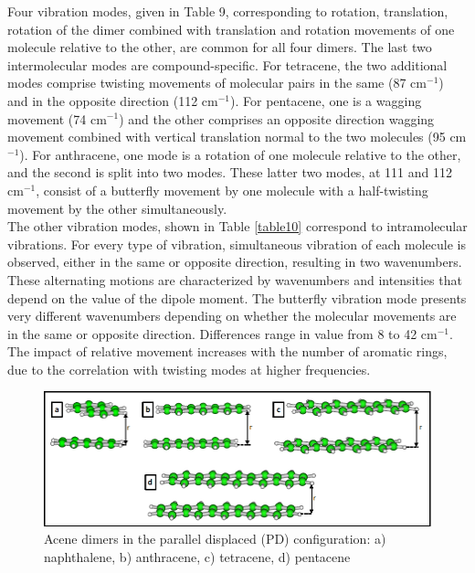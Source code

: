 Four vibration modes, given in Table 9, corresponding to rotation, translation, rotation of the dimer combined with translation and rotation movements of one molecule relative to the other, are common for all four dimers. The last two intermolecular modes are compound-specific. For tetracene, the two additional modes comprise twisting movements of molecular pairs in the same (87 cm$^{-1}$) and in the opposite direction (112 cm$^{-1}$). For pentacene, one is a wagging movement (74 cm$^{-1}$) and the other comprises an opposite direction wagging movement combined with vertical translation normal to the two molecules (95 cm$^{-1}$). For anthracene, one mode is a rotation of one molecule relative to the other, and the second is split into two modes. These latter two modes, at 111 and 112 cm$^{-1}$, consist of a butterfly movement by one molecule with a half-twisting movement by the other simultaneously.\\

The other vibration modes, shown in Table \ref{table10} correspond to intramolecular vibrations. For every type of vibration, simultaneous vibration of each molecule is observed, either in the same or opposite direction, resulting in two wavenumbers. These alternating motions are characterized by wavenumbers and intensities that depend on the value of the dipole moment. The butterfly vibration mode presents very different wavenumbers depending on whether the molecular movements are in the same or opposite direction. Differences range in value from 8 to 42 cm$^{-1}$. The impact of relative movement increases with the number of aromatic rings, due to the correlation with twisting modes at higher frequencies. 

\begin{figure}[H]
	\centering
	\includegraphics[scale=0.55]{image/acene-dimers}
	\caption[Acene dimers in the parallel displaced configuration]{Acene dimers in the parallel displaced (PD) configuration: a) naphthalene, b) anthracene, c) tetracene, d) pentacene}
\end{figure}


